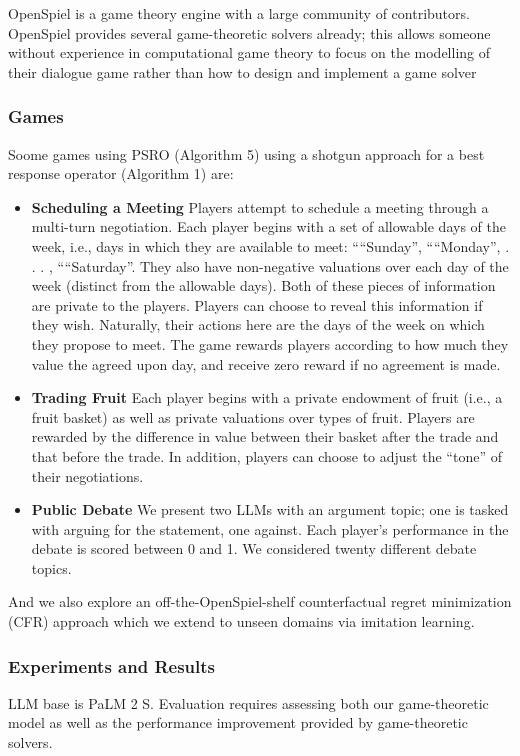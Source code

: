 \documentclass[12pt]{article}
\begin{document}
OpenSpiel is a game theory engine with a large community of contributors.
OpenSpiel provides several game-theoretic solvers already; this allows someone without experience
in computational game theory to focus on the modelling of their dialogue game rather than how to
design and implement a game solver
\subsubsection{Games}
Soome games using PSRO (Algorithm 5) using a shotgun approach for a best
response operator (Algorithm 1) are:
\begin{itemize}
  \item \textbf{Scheduling a Meeting} Players attempt to schedule a meeting through a multi-turn negotiation. Each player begins with a set of allowable days of the week, i.e., days in
  which they are available to meet: ``“Sunday'', ``“Monday'', . . . , ``“Saturday''. They also have non-negative
  valuations over each day of the week (distinct from the allowable days). Both of these pieces of
  information are private to the players. Players can choose to reveal this information if they wish.
  Naturally, their actions here are the days of the week on which they propose to meet. The game
  rewards players according to how much they value the agreed upon day, and receive zero reward if
  no agreement is made.
  \item \textbf{Trading Fruit}  Each player begins with a private endowment of fruit (i.e., a fruit basket)
  as well as private valuations over types of fruit. Players are rewarded by the difference in value
  between their basket after the trade and that before the trade. In addition, players can choose to adjust
  the  ``tone'' of their negotiations.
  \item \textbf{Public Debate} We present
  two LLMs with an argument topic; one is tasked with arguing for the statement, one against. Each player's performance in the debate is scored between 0 and 1. We considered twenty different debate topics.
\end{itemize}
And we also explore an off-the-OpenSpiel-shelf counterfactual
regret minimization (CFR) approach which we extend to unseen domains via imitation learning.
\subsubsection{Experiments and Results}
LLM base is PaLM 2 S. Evaluation requires
assessing both our game-theoretic model as well as the performance improvement provided by game-theoretic solvers. 
\end{document}
